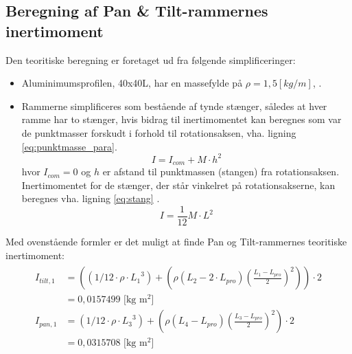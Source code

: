 \subsection{Beregning af Pan \& Tilt-rammernes inertimoment}
Den teoritiske beregning er foretaget ud fra følgende simplificeringer:
\begin{itemize}
\item Aluminimumsprofilen, 40x40L, har en massefylde på \(\rho=1,5 [kg/m]\), \citep[Kap. 2 side. 4]{alu_profil_desitet}.
\item Rammerne simplificeres som bestående af tynde stænger, således at hver ramme har to stænger, hvis bidrag
til inertimomentet kan beregnes som var de punktmasser forskudt i forhold til rotationsaksen\citep[Side. 254, ligning 10-36]{fund_of_physics},
vha. ligning \ref{eq:punktmasse_para}.
\begin{equation}
I={ I }_{ com }+M\cdot { h }^{ 2 }
\label{eq:punktmasse_para} 
\end{equation}
hvor \({I_{com}} = 0\) og \(h\) er afstand til punktmassen (stangen) fra rotationsaksen.
Inertimomentet for de stænger, der står vinkelret på rotationsakserne, kan beregnes vha. ligning \ref{eq:stang}
\citep[Side. 255, tabel 10-2e]{fund_of_physics}.
\begin{equation}
I=\frac { 1 }{ 12 } M\cdot { L }^{ 2 }
\label{eq:stang} 
\end{equation}
\end{itemize}

Med ovenstående formler er det muligt at finde Pan og Tilt-rammernes teoritiske inertimoment:
\begin{align}
\label{eq:inerti_tilt_pan}
\begin{split}
{ I }_{ tilt,1 } &= \left( \left( 1/12\cdot \rho \cdot { {L_{1}} }^{ 3 } \right) +\left( \rho \left( {L_{2}}-2\cdot {L_{pro}} \right) { \left( \frac { {L_{1}}-{L_{pro}}}{ 2 }  \right)  }^{ 2 } \right)  \right) \cdot 2
\\
 &= 0,0157499 \text{ [kg m$^2$]}
\\
{ I }_{ pan,1 }&=\left( 1/12\cdot \rho \cdot { { L }_{ 3 } }^{ 3 } \right) +\left( \rho \left( { L }_{ 4 }-{ L }_{ pro } \right) { \left( \frac { { L }_{ 3 }-{ L }_{ pro } }{ 2 }  \right)  }^{ 2 } \right) \cdot 2
\\
 &=0,0315708 \text{ [kg m$^2$]}
\end{split}
\end{align}

